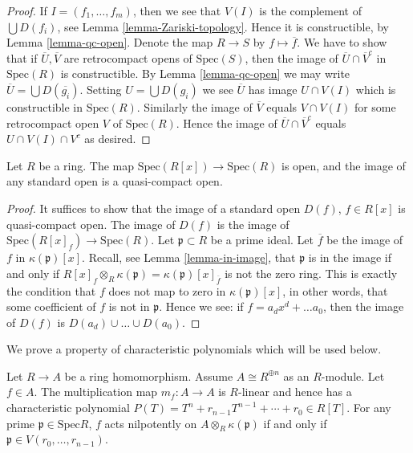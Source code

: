 \begin{proof}
If $I = (f_1,\ldots,f_m)$, then we see that
$V(I)$ is the complement of $\bigcup D(f_i)$,
see Lemma \ref{lemma-Zariski-topology}.
Hence it is constructible, by Lemma \ref{lemma-qc-open}.
Denote the map $R \to S$ by $f \mapsto \overline{f}$.
We have to show that if $\overline{U}, \overline{V}$
are retrocompact opens of $\text{Spec}(S)$, then the
image of $\overline{U} \cap \overline{V}^c$
in $\text{Spec}(R)$ is constructible.
By Lemma \ref{lemma-qc-open} we may write
$\overline{U} = \bigcup D(\overline{g_i})$.
Setting $U = \bigcup D({g_i})$ we see $\overline{U}$
has image $U \cap V(I)$ which is constructible in
$\text{Spec}(R)$. Similarly the image of $\overline{V}$ equals
$V \cap V(I)$ for some retrocompact open $V$ of $\text{Spec}(R)$.
Hence the image of $\overline{U} \cap \overline{V}^c$
equals $U \cap V(I) \cap V^c$ as desired.
\end{proof}

\begin{lemma}
\label{lemma-affineline-open}
Let $R$ be a ring. The map $\text{Spec}(R[x]) \to \text{Spec}(R)$
is open, and the image of any standard open is a quasi-compact
open.
\end{lemma}

\begin{proof}
It suffices to show that the image of a standard open
$D(f)$, $f\in R[x]$ is quasi-compact open.
The image of $D(f)$ is the image of
$\text{Spec}(R[x]_f) \to \text{Spec}(R)$.
Let $\mathfrak p \subset R$ be a prime ideal.
Let $\overline{f}$ be the image of $f$ in
$\kappa(\mathfrak p)[x]$.
Recall, see Lemma \ref{lemma-in-image},
that $\mathfrak p$ is in the image
if and only if $R[x]_f \otimes_R \kappa(\mathfrak p) =
\kappa(\mathfrak p)[x]_{\overline{f}}$ is not the
zero ring. This is exactly the condition that $f$ does not map
to zero in $\kappa(\mathfrak p)[x]$, in other words, that
some coefficient of $f$ is not in $\mathfrak p$.
Hence we see: if $f = a_d x^d + \ldots a_0$, then
the image of $D(f)$ is $D(a_d) \cup \ldots \cup D(a_0)$.
\end{proof}

\noindent
We prove a property of characteristic polynomials which
will be used below.

\begin{lemma}
\label{lemma-characteristic-polynomial-prime}
Let $R \to A$ be a ring homomorphism.
Assume $A \cong R^{\oplus n}$ as an $R$-module.
Let $f \in A$. The multiplication map $m_f: A
\to A$ is $R$-linear and hence
has a characteristic polynomial
$P(T) = T^n + r_{n-1}T^{n-1} + \cdots + r_0 \in R[T]$.
For any prime
$\mathfrak{p} \in \text{Spec} R$, $f$ acts nilpotently on $A
\otimes_R \kappa(\mathfrak{p})$ if and only if $\mathfrak p \in
V(r_0,\ldots, r_{n-1})$.
\end{lemma}

